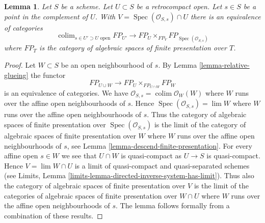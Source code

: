 \documentclass{stacks-project}
\theoremstyle{plain}
\newtheorem{lemma}[subsection]{Lemma}
\theoremstyle{definition}
\theoremstyle{remark}
\numberwithin{equation}{subsection}
\def\lim{\mathop{\mathrm{lim}}\nolimits}
\def\colim{\mathop{\mathrm{colim}}\nolimits}
\def\Spec{\mathop{\mathrm{Spec}}}
\begin{document}
\begin{lemma}
\label{lemma-glueing-near-point}
Let $S$ be a scheme. Let $U \subset S$ be a retrocompact open.
Let $s \in S$ be a point in the complement of $U$. With
$V = \Spec(\mathcal{O}_{S, s}) \cap U$ there is
an equivalence of categories
$$
\colim_{s \in U' \supset U\text{ open}} FP_{U'}
\longrightarrow
FP_U \times_{FP_V} FP_{\Spec(\mathcal{O}_{S, s})}
$$
where $FP_T$  is the category of algebraic spaces of finite presentation
over $T$.
\end{lemma}

\begin{proof}
Let $W \subset S$ be an open neighbourhood of $s$. By
Lemma \ref{lemma-relative-glueing} the functor
$$
FP_{U \cup W}
\longrightarrow
FP_U \times_{FP_{U \cap W}} FP_W
$$
is an equivalence of categories. We have
$\mathcal{O}_{S, s} = \colim \mathcal{O}_W(W)$ where
$W$ runs over the affine open neighbourhoods of $s$.
Hence $\Spec(\mathcal{O}_{S, s}) = \lim W$ where $W$
runs over the affine open neighbourhoods of $s$.
Thus the category of algebraic spaces of finite presentation
over $\Spec(\mathcal{O}_{S, s})$ is the limit of the
category of algebraic spaces of finite presentation over
$W$ where $W$ runs over the affine open neighbourhoods
of $s$, see
Lemma \ref{lemma-descend-finite-presentation}.
For every affine open $s \in W$ we see that $U \cap W$
is quasi-compact as $U \to S$ is quasi-compact.
Hence $V = \lim W \cap U$ is a limit of
quasi-compact and quasi-separated schemes (see
Limits, Lemma \ref{limits-lemma-directed-inverse-system-has-limit}).
Thus also the category of algebraic spaces of finite presentation
over $V$ is the limit of the
categories of algebraic spaces of finite presentation over
$W \cap U$ where $W$ runs over the affine open neighbourhoods
of $s$. The lemma follows formally from a combination
of these results.
\end{proof}
\end{document}
